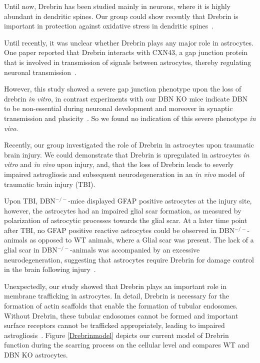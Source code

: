 \documentclass[a4paper,11pt,bibtotocnumbered]{article}
\begin{document}
Until now, Drebrin has been studied mainly in neurons, where it is highly abundant in dendritic spines. Our group could show recently that Drebrin is important in protection against oxidative stress in dendritic spines~\cite{Kreis2019}.



Until recently, it was unclear whether Drebrin plays any major role in astrocytes. One paper reported that Drebrin interacts with CXN43, a gap junction protein that is involved in transmission of signals between astrocytes, thereby regulating neuronal transmission~\cite{Butkevich2004}.

However, this study showed a severe gap junction phenotype upon the loss of drebrin \textit{in vitro}, in contrast experiments with our DBN KO mice indicate DBN to be non-essential during neuronal development and moreover in synaptic transmission and plasicity~\cite{Willmes2017}. So we found no indication of this severe phenotype \textit{in vivo}. 


Recently, our group investigated the role of Drebrin in astrocytes upon traumatic brain injury. We could demonstrate that Drebrin is upregulated in astrocytes \textit{in vitro} and \textit{in vivo} upon injury, and, that the loss of Drebrin leads to severly impaired astrogliosis and subsequent neurodegeneration in an \textit{in vivo} model of traumatic brain injury (TBI).


Upon TBI, DBN$^{-/-}$-mice displayed GFAP positive astrocytes at the injury site, however, the astrocytes had an impaired glial scar formation, as measured by polarization of astrocytic processes towards the glial scar. At a later time point after TBI, no GFAP positive reactive astrocytes could be observed in DBN$^{-/-}$-animals as opposed to WT animals, where a Glial scar was present. The lack of a glial scar in DBN$^{-/-}$-animals was accompanied by an excessive neurodegeneration, suggesting that astrocytes require Drebrin for damage control in the brain following injury~\cite{Schiweck2020}.   


Unexpectedly, our study showed that Drebrin plays an important role in membrane trafficking in astrocytes. In detail, Drebrin is necessary for the formation of actin scaffolds that enable the formation of tubular endosomes. Without Drebrin, these tubular endosomes cannot be formed and important surface receptors cannot be trafficked appropriately, leading to impaired astrogliosis~\cite{Schiweck2020}. Figure \ref{Drebrinmodel} depicts our current model of Drebrin function during the scarring process on the cellular level and compares WT and DBN KO astrocytes. 
\end{document}
